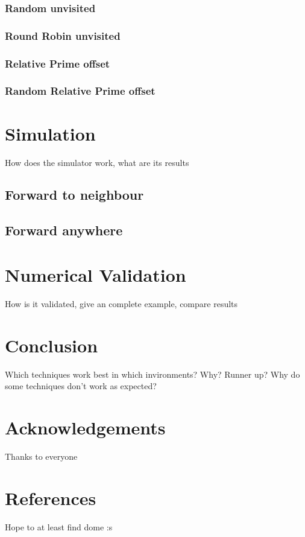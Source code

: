 \documentclass[10pt,a4paper,titlepage]{article}
\begin{document}
\subsubsection{Random unvisited}

\subsubsection{Round Robin unvisited}

\subsubsection{Relative Prime offset}

\subsubsection{Random Relative Prime offset}


\section{Simulation}
How does the simulator work, what are its results
\subsection{Forward to neighbour}
\subsection{Forward anywhere}

\section{Numerical Validation}
How is it validated, give an complete example, compare results

\section{Conclusion}
Which techniques work best in which invironments? Why? Runner up? Why do some techniques don't work as expected?

\section*{Acknowledgements}
Thanks to everyone

\section*{References}
Hope to at least find dome :s
\end{document}
